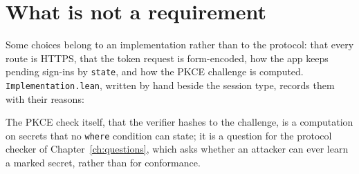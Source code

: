 

\section{What is not a requirement}

Some choices belong to an implementation rather than to the protocol: that every
route is HTTPS, that the token request is form-encoded, how the app keeps pending
sign-ins by \texttt{state}, and how the PKCE challenge is computed.
\texttt{Implementation.lean}, written by hand beside the session type, records
them with their reasons:



The PKCE check itself, that the verifier hashes to the challenge, is a computation
on secrets that no \texttt{where} condition can state; it is a question for the
protocol checker of Chapter~\ref{ch:questions}, which asks whether an attacker can
ever learn a marked secret, rather than for conformance.
